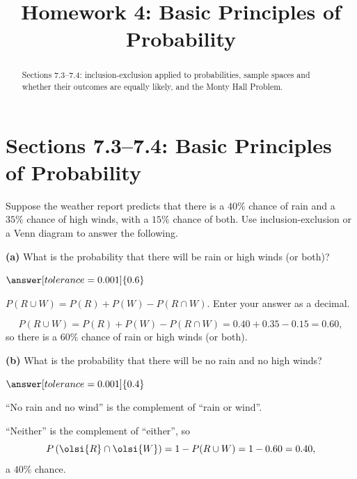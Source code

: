 \documentclass[12pt]{ximera}
\title{Homework 4: Basic Principles of Probability}
\begin{document}
\begin{abstract}
Sections 7.3--7.4: inclusion-exclusion applied to probabilities, sample spaces and
whether their outcomes are equally likely, and the Monty Hall Problem.
\end{abstract}
\maketitle

\section*{Sections 7.3--7.4: Basic Principles of Probability}

\begin{problem}
Suppose the weather report predicts that there is a $40\%$ chance of rain and a
$35\%$ chance of high winds, with a $15\%$ chance of both. Use inclusion-exclusion
or a Venn diagram to answer the following.

\begin{prompt}
\textbf{(a)} What is the probability that there will be rain or high winds (or
both)?

$\answer[tolerance=0.001]{0.6}$

\begin{hint}
$P(R\cup W)=P(R)+P(W)-P(R\cap W)$. Enter your answer as a decimal.
\end{hint}

\begin{feedback}
\[
P(R\cup W)=P(R)+P(W)-P(R\cap W)=0.40+0.35-0.15=0.60,
\]
so there is a $60\%$ chance of rain or high winds (or both).
\end{feedback}
\end{prompt}

\begin{prompt}
\textbf{(b)} What is the probability that there will be no rain and no high winds?

$\answer[tolerance=0.001]{0.4}$

\begin{hint}
``No rain and no wind'' is the complement of ``rain or wind''.
\end{hint}

\begin{feedback}
``Neither'' is the complement of ``either'', so
\[
P\left(\olsi{R}\cap\olsi{W}\right)=1-P(R\cup W)=1-0.60=0.40,
\]
a $40\%$ chance.
\end{feedback}
\end{prompt}
\end{problem}
\end{document}

